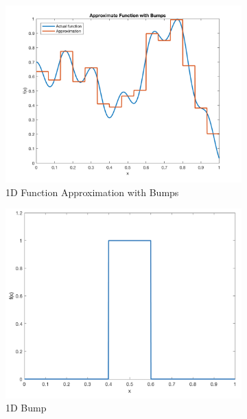 \documentclass{article}
\begin{document}
\begin{figure}[h!]
\centering
\begin{subfigure}{.54\textwidth}
  \centering
  \includegraphics[width=.99\linewidth]{approximation.png}
  \caption{1D Function Approximation with Bumps}
  \label{fig:approximation_1d}
\end{subfigure}
\begin{subfigure}{.45\textwidth}
  \centering
  \includegraphics[width=.99\linewidth]{bump.png}
  \caption{1D Bump}
  \label{fig:bump}
\end{subfigure}
\begin{subfigure}{.45\textwidth}
  \centering

\end{subfigure}
\end{figure}
\end{document}
